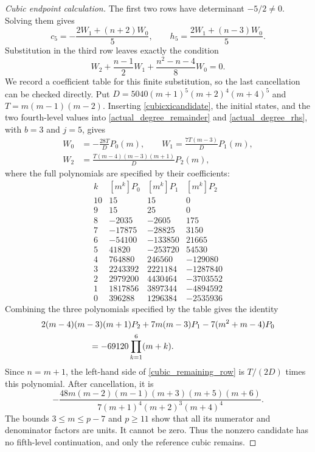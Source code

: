 \documentclass[12pt]{article}
\theoremstyle{remark}
\begin{document}
\begin{proof}[Cubic endpoint calculation]
The first two rows have determinant $-5/2\ne0$.  Solving them gives
\[
 c_5=-\frac{2W_1+(n+2)W_0}{5},\qquad
 h_5=\frac{2W_1+(n-3)W_0}{5}.
\]
Substitution in the third row leaves exactly the condition
\begin{equation}\label{cubic_remaining_row}
 W_2+\frac{n-1}{2}W_1+\frac{n^2-n-4}{8}W_0=0.
\end{equation}
We record a coefficient table for this finite substitution, so the
last cancellation can be checked directly.  Put
$D=5040(m+1)^5(m+2)^4(m+4)^5$ and $T=m(m-1)(m-2)$.
Inserting \eqref{cubicxicandidate}, the initial states, and the two
fourth-level values into \eqref{actual_degree_remainder} and
\eqref{actual_degree_rhs}, with $b=3$ and $j=5$, gives
\[
\begin{aligned}
 W_0&=-\frac{28T}{D}P_0(m),\qquad
 W_1=\frac{7T(m-3)}{D}P_1(m),\\
 W_2&=\frac{T(m-4)(m-3)(m+1)}{D}P_2(m),
\end{aligned}
\]
where the full polynomials are specified by their coefficients:
\begin{equation*}
 \begin{array}{c|r|r|r}
 k &[m^k]P_0 &[m^k]P_1 &[m^k]P_2\\ \hline
10&15&15&0\\
9&15&25&0\\
8&-2035&-2605&175\\
7&-17875&-28825&3150\\
6&-54100&-133850&21665\\
5&41820&-253720&54530\\
4&764880&246560&-129080\\
3&2243392&2221184&-1287840\\
2&2979200&4430464&-3703552\\
1&1817856&3897344&-4894592\\
0&396288&1296384&-2535936
\end{array}
\end{equation*}
Combining the three polynomials specified by the table gives the identity
\[
\begin{split}
 &2(m-4)(m-3)(m+1)P_2
       +7m(m-3)P_1-7(m^2+m-4)P_0\\
 &\hspace{20mm}=-69120\prod_{k=1}^{6}(m+k).
\end{split}
\]
Since $n=m+1$, the left-hand side of \eqref{cubic_remaining_row} is
$T/(2D)$ times this polynomial.  After cancellation, it is
\begin{equation}\label{cubicfifth}
 -\frac{48m(m-2)(m-1)(m+3)(m+5)(m+6)}
 {7(m+1)^4(m+2)^3(m+4)^4}.
\end{equation}
The bounds $3\le m\le p-7$ and $p\ge11$ show that all its numerator
and denominator factors are units.  It cannot be zero.  Thus the
nonzero candidate has no fifth-level continuation, and only the
reference cubic remains.
\end{proof}
\end{document}

